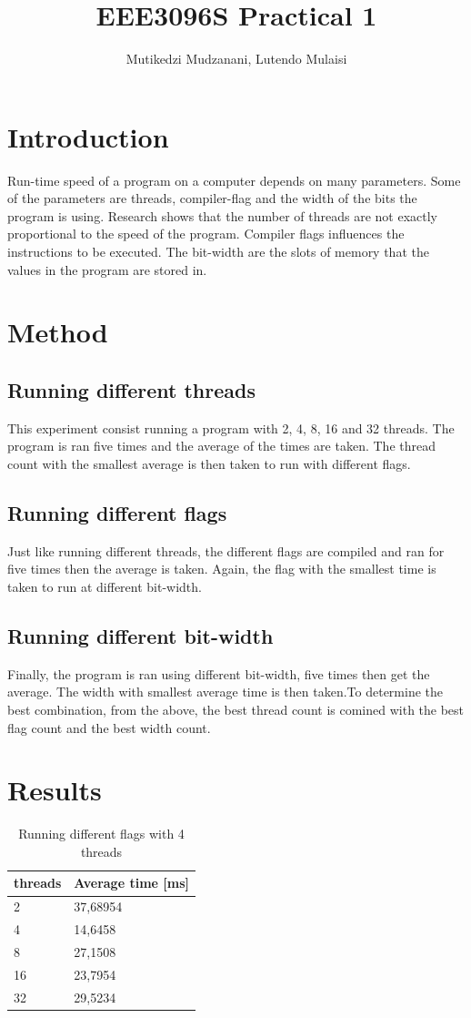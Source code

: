 \documentclass[twocolumn]{article}
\title{EEE3096S Practical 1}
\author{Mutikedzi Mudzanani, Lutendo Mulaisi}
\begin{document}
\maketitle

\section{Introduction}
Run-time speed of a program on a computer depends on many parameters. Some of the parameters are threads, compiler-flag and the width of the bits the program is using. Research shows that the number of threads are not exactly proportional to the speed of the program. Compiler flags influences the instructions to be executed. The bit-width are the slots of memory that the values in the program are stored in.
\section{Method}
\subsection{Running different threads}
This experiment consist running a program with 2, 4, 8, 16 and 32 threads. The program is ran five times and the average of the times are taken. The thread count with the smallest average is then taken to run with different flags.
\subsection{Running different flags}
Just like running different threads, the different flags are compiled and ran for five times then the average is taken. Again, the flag with the smallest time is taken to run at different bit-width.
\subsection{Running different bit-width}
Finally, the program is ran using different bit-width, five times then get the average. The width with smallest average time is then taken.To determine the best combination, from the above, the best thread count is comined with the best flag count and the best width count.

\section{Results}
\begin{table}[!ht]
    \centering
    \caption{Running different flags with 4 threads}
    \begin{tabular}{|l|l|}
    \hline
        threads & Average time [ms] \\ \hline
        2 & 37,68954 \\ \hline
        4 & 14,6458 \\ \hline
        8 & 27,1508 \\ \hline
        16 & 23,7954 \\ \hline
        32 & 29,5234 \\ \hline
    \end{tabular}
    \label{Table 1}
\end{table}
\end{document}
